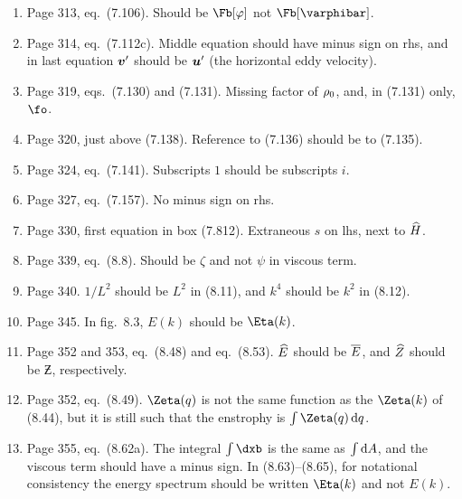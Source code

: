 \documentclass[10pt]{article}
\newcommand{\eq}{eq.\ } \newcommand{\Eq}{Eq.\ }
\begin{document}
\begin{enumerate}
\item Page 313, \eq (7.106). Should be $\Fb[\varphi]$ not $\Fb[\varphibar]$.

\item Page 314, \eq (7.112c). Middle equation should have minus sign on rhs, and in last equation ${\bm {v}}'$ should be ${\bm {u}}'$ (the horizontal eddy velocity).


\item Page 319, eqs.\ (7.130) and (7.131). Missing factor of $\rho_0$, and, in (7.131) only, $\fo$.

\item Page 320, just above (7.138). Reference to (7.136) should be to (7.135).

\item Page 324, \eq (7.141). Subscripts $1$ should be subscripts $i$. 


\item Page 327, \eq (7.157). No minus sign on rhs.

\item Page 330, first equation in box (7.812). Extraneous $s$ on lhs, next to $\widehat H$.

\item Page 339, \eq (8.8). Should be $\zeta$ and not $\psi$ in viscous term. 


\item Page 340. $1/L^2$ should be $L^2$ in (8.11), and $k^4$ should be $k^2$ in (8.12).

\item Page 345. In fig.\ 8.3, $E(k)$ should be $\Eta(k)$.

\item Page 352 and 353, \eq (8.48) and \eq (8.53). $\widehat E$ should be $\overline E$, and $\widehat Z$ should be $\Zbar$, respectively.

\item Page 352, \eq (8.49).  $\Zeta(q)$ is not the same function as the $\Zeta(k)$ of (8.44), but it is still such that the enstrophy is $\int \Zeta(q) \, \d q$. 

\item Page 355, \eq (8.62a). The integral $\int \dxb$ is the same as $\int \mathrm{d} A$, and the viscous term should have a minus sign. In (8.63)--(8.65), for notational consistency the energy spectrum should be written $\Eta(k)$ and not $E(k)$.


\end{enumerate}
\end{document}
